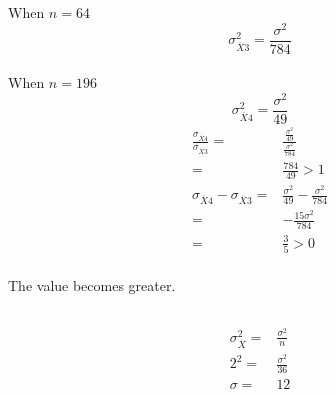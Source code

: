 \documentclass{article}
\begin{document}
            \subsubsection{}
                \paragraph{}
                When $n=64$
                $$\sigma_{\overline{X}3}^2=\frac{\sigma^2}{784}$$
                \paragraph{}
                When $n=196$
                $$\sigma_{\overline{X}4}^2=\frac{\sigma^2}{49}$$
                \begin{equation*}
                    \begin{split}
                        \frac{\sigma_{\overline{X}4}}{\sigma_{\overline{X}3}}=&\frac{\frac{\sigma^2}{49}}{\frac{\sigma^2}{784}}\\
                            =&\frac{784}{49}>1\\
                        \sigma_{\overline{X}4}-\sigma_{\overline{X}3}=&\frac{\sigma^2}{49}-\frac{\sigma^2}{784}\\
                            =&-\frac{15\sigma^2}{784}\\
                            =&\frac{3}{5}>0
                    \end{split}
                \end{equation*}
                \paragraph{}
                The value becomes greater.
        \subsection{}
            \subsubsection{}
                \paragraph{}
                \begin{equation*}
                    \begin{split}
                        \sigma_{\overline{X}}^2=&\frac{\sigma^2}{n}\\
                        2^2=&\frac{\sigma^2}{36}\\
                        \sigma=&12\\
                    \end{split}
                \end{equation*}
\end{document}
